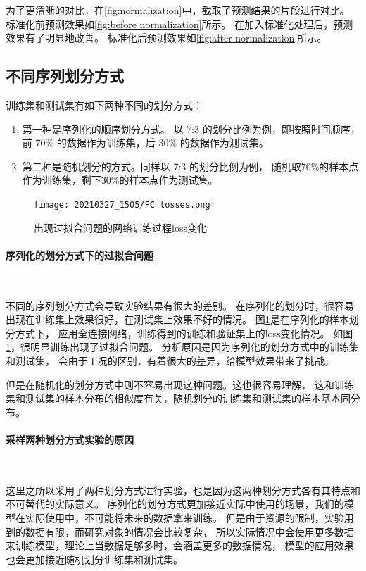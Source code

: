   为了更清晰的对比，在\ref{fig:normalization}中，截取了预测结果的片段进行对比。
  标准化前预测效果如\ref{fig:before normalization}所示。
  在加入标准化处理后，预测效果有了明显地改善。
  标准化后预测效果如\ref{fig:after normalization}所示。

  \subsection{不同序列划分方式}\label{subsection_diffrent_divide}
    训练集和测试集有如下两种不同的划分方式：
    \begin{enumerate}
      \item 第一种是序列化的顺序划分方式。
      以 7:3 的划分比例为例，即按照时间顺序，前 70\% 的数据作为训练集，后 30\% 的数据作为测试集。
      \item 第二种是随机划分的方式。同样以 7:3 的划分比例为例，
      随机取70\%的样本点作为训练集，剩下30\%的样本点作为测试集。
    \end{enumerate}

    \begin{figure}
      \centering
      \texttt{[image: 20210327\_1505/FC losses.png]}
      \caption{出现过拟合问题的网络训练过程loss变化}
      \label{fig:overfit FC}
    \end{figure}
    
    \paragraph{序列化的划分方式下的过拟合问题}~{}

    不同的序列划分方式会导致实验结果有很大的差别。
    在序列化的划分时，很容易出现在训练集上效果很好，在测试集上效果不好的情况。
    图\ref{fig:overfit FC}是在序列化的样本划分方式下，
    应用全连接网络，训练得到的训练和验证集上的loss变化情况。
    如图\ref{fig:overfit FC}，很明显训练出现了过拟合问题。
    分析原因是因为序列化的划分方式中的训练集和测试集，
    会由于工况的区别，有着很大的差异，给模型效果带来了挑战。

    但是在随机化的划分方式中则不容易出现这种问题。这也很容易理解，
    这和训练集和测试集的样本分布的相似度有关，随机划分的训练集和测试集的样本基本同分布。

    \paragraph{采样两种划分方式实验的原因}~{}

    这里之所以采用了两种划分方式进行实验，也是因为这两种划分方式各有其特点和不可替代的实际意义。
    序列化的划分方式更加接近实际中使用的场景，我们的模型在实际使用中，不可能将未来的数据拿来训练。
    但是由于资源的限制，实验用到的数据有限，而研究对象的情况会比较复杂，
    所以实际情况中会使用更多数据来训练模型，理论上当数据足够多时，会涵盖更多的数据情况，
    模型的应用效果也会更加接近随机划分训练集和测试集。

